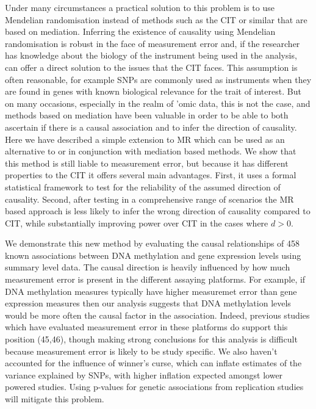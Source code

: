 \documentclass[]{article}
\begin{document}
Under many circumstances a practical solution to this problem is to use
Mendelian randomisation instead of methods such as the CIT or similar
that are based on mediation. Inferring the existence of causality using
Mendelian randomisation is robust in the face of measurement error and,
if the researcher has knowledge about the biology of the instrument
being used in the analysis, can offer a direct solution to the issues
that the CIT faces. This assumption is often reasonable, for example
SNPs are commonly used as instruments when they are found in genes with
known biological relevance for the trait of interest. But on many
occasions, especially in the realm of 'omic data, this is not the case,
and methods based on mediation have been valuable in order to be able to
both ascertain if there is a causal association and to infer the
direction of causality. Here we have described a simple extension to MR
which can be used as an alternative to or in conjunction with mediation
based methods. We show that this method is still liable to measurement
error, but because it has different properties to the CIT it offers
several main advantages. First, it uses a formal statistical framework
to test for the reliability of the assumed direction of causality.
Second, after testing in a comprehensive range of scenarios the MR based
approach is less likely to infer the wrong direction of causality
compared to CIT, while substantially improving power over CIT in the
cases where \(d > 0\).

We demonstrate this new method by evaluating the causal relationships of
458 known associations between DNA methylation and gene expression
levels using summary level data. The causal direction is heavily
influenced by how much measurement error is present in the different
assaying platforms. For example, if DNA methylation measures typically
have higher measuremet error than gene expression measures then our
analysis suggests that DNA methylation levels would be more often the
causal factor in the association. Indeed, previous studies which have
evaluated measurement error in these platforms do support this position
(45,46), though making strong conclusions for this analysis is difficult
because measurement error is likely to be study specific. We also
haven't accounted for the influence of winner's curse, which can inflate
estimates of the variance explained by SNPs, with higher inflation
expected amongst lower powered studies. Using p-values for genetic
associations from replication studies will mitigate this problem.
\end{document}
